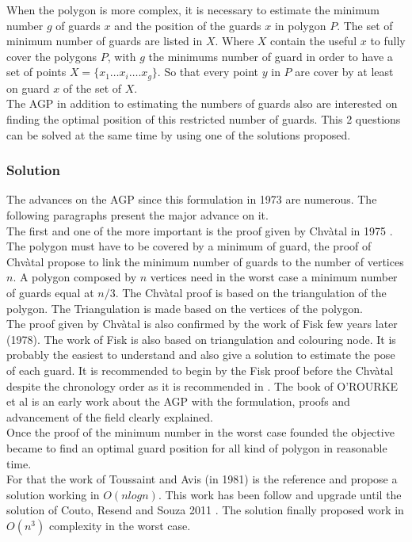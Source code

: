 When the polygon is more complex, it is necessary to estimate the minimum number $g$ of guards $x$ and the position of the guards $x$ in polygon $P$. 
 The set of minimum number of guards are listed in $X$. Where $X$ contain the useful $x$ to fully cover the polygons $P$, with $g$ the minimums number of guard in order to have a set of points $X=\{x_1…x_i…. x_g\}$. So that every point $y$ in $P$  are cover by at least on guard $x$ of the set of $X$. \\
The AGP in addition to estimating the numbers of guards also are interested on finding the optimal position of this restricted number of guards. 
This 2 questions can be solved at the same time by using one of the solutions proposed.


	\subsubsection{Solution }
	
	The advances on the AGP since this formulation in 1973 are numerous. The following paragraphs present the major advance on it.\\
	 The first and one of the more important is the proof given by Chvàtal in 1975 \cite{44*chvatal1975}.  The polygon must have to be covered by a minimum of guard, the proof of Chvàtal propose to link the minimum number of guards to the number of vertices $n$. 
A polygon composed by $n$ vertices need in the worst case a minimum number of guards equal at $n/3$. The Chvàtal proof is based on the triangulation of the polygon. The Triangulation is made based on the vertices of the polygon.\\
	     The proof given by Chvàtal is also confirmed by the work of Fisk  few years later (1978). The work of Fisk is also based on triangulation and colouring node. It is probably the easiest to understand and also give a solution to estimate the pose of each guard. It is recommended to begin by the Fisk proof before the Chvàtal despite the chronology order as it is recommended in \cite{219*orourke1987}. The book of O'ROURKE et al \cite{219*orourke1987} is an early work about the AGP with the formulation, proofs and advancement of the field clearly explained. \\
Once the proof of the minimum number in the worst case founded the objective became to find an optimal guard position for all kind of polygon in reasonable time. \\
For that the work of Toussaint and Avis (in 1981) is the reference and propose a solution working in $O(n log n)$. This work has been follow and upgrade until the solution of Couto, Resend and Souza  2011 \cite{224*couto2011}. The solution  finally proposed work in $O(n^3)$ complexity in the worst case. 

